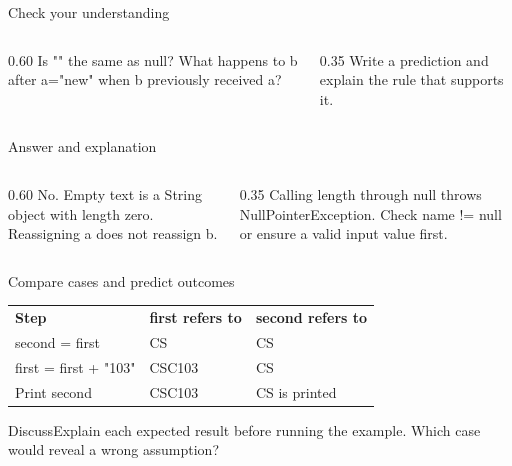 \documentclass[10pt,aspectratio=169]{beamer}
\begin{document}
\begin{frame}[fragile,t]{Check your understanding}
\begin{columns}[T,onlytextwidth]\begin{column}{0.60\textwidth}
Is "" the same as null? What happens to b after a="new" when b previously received a?
\end{column}\begin{column}{0.35\textwidth}\small
Write a prediction and explain the rule that supports it.
\end{column}\end{columns}
\end{frame}

\begin{frame}[fragile,t]{Answer and explanation}
\begin{columns}[T,onlytextwidth]\begin{column}{0.60\textwidth}
No. Empty text is a String object with length zero. Reassigning a does not reassign b.
\end{column}\begin{column}{0.35\textwidth}\small
Calling length through null throws NullPointerException. Check name != null or ensure a valid input value first.
\end{column}\end{columns}
\end{frame}


\begin{frame}[fragile,t]{Compare cases and predict outcomes}
\small\renewcommand{\arraystretch}{1.5}
\begin{tabularx}{\textwidth}{>{\raggedright\arraybackslash}X>{\raggedright\arraybackslash}X>{\raggedright\arraybackslash}X}\rowcolor{navy}
\color{white}\bfseries Step & \color{white}\bfseries first refers to & \color{white}\bfseries second refers to\\
second = first & CS & CS\\
first = first + "103" & CSC103 & CS\\
Print second & CSC103 & CS is printed\\
\end{tabularx}\par\vspace{3mm}\begin{exampleblock}{Discuss}Explain each expected result before running the example. Which case would reveal a wrong assumption?\end{exampleblock}
\end{frame}
\end{document}
